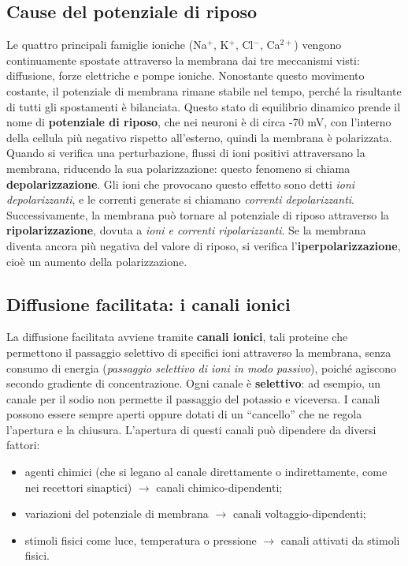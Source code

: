 \subsection{Cause del potenziale di riposo}

Le quattro principali famiglie ioniche (Na$^{+}$, K$^{+}$, Cl$^{-}$, Ca$^{2+}$) vengono continuamente spostate attraverso la membrana dai tre meccanismi visti: diffusione, forze elettriche e pompe ioniche. Nonostante questo movimento costante, il potenziale di membrana rimane stabile nel tempo, perché la risultante di tutti gli spostamenti è bilanciata.
Questo stato di equilibrio dinamico prende il nome di \textbf{potenziale di riposo}, che nei neuroni è di circa -70 mV, con l'interno della cellula più negativo rispetto all'esterno, quindi la membrana è polarizzata.
Quando si verifica una perturbazione, flussi di ioni positivi attraversano la membrana, riducendo la sua polarizzazione: questo fenomeno si chiama \textbf{depolarizzazione}. Gli ioni che provocano questo effetto sono detti \textit{ioni depolarizzanti}, e le correnti generate si chiamano \textit{correnti depolarizzanti}. Successivamente, la membrana può tornare al potenziale di riposo attraverso la \textbf{ripolarizzazione}, dovuta a \textit{ioni e correnti ripolarizzanti}. Se la membrana diventa ancora più negativa del valore di riposo, si verifica l'\textbf{iperpolarizzazione}, cioè un aumento della polarizzazione.


\subsection{Diffusione facilitata: i canali ionici}

La diffusione facilitata avviene tramite \textbf{canali ionici}, tali proteine che
permettono il passaggio selettivo di specifici ioni attraverso la membrana, senza
consumo di energia (\textit{passaggio selettivo di ioni in modo passivo}), poiché
agiscono secondo gradiente di concentrazione.
Ogni canale è \textbf{selettivo}: ad esempio, un canale per il sodio non permette
il passaggio del potassio e viceversa.
I canali possono essere sempre aperti oppure dotati di un ``cancello'' che ne regola
l'apertura e la chiusura. L'apertura di questi canali può dipendere da diversi fattori:
\begin{itemize}
  \item agenti chimici (che si legano al canale direttamente o indirettamente, come
    nei recettori sinaptici) $\rightarrow$ canali chimico-dipendenti;
  \item variazioni del potenziale di membrana $\rightarrow$ canali voltaggio-dipendenti;
  \item stimoli fisici come luce, temperatura o pressione $\rightarrow$ canali attivati
    da stimoli fisici.
\end{itemize}

